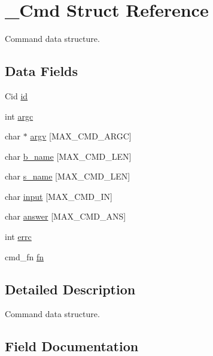 \hypertarget{struct__Cmd}{}\section{\+\_\+\+Cmd Struct Reference}
\label{struct__Cmd}


Command data structure.  


\subsection*{Data Fields}
\begin{DoxyCompactItemize}
\item 
Cid \hyperlink{struct__Cmd_a106b2045967078710623e3a5f401dde2}{id}
\item 
int \hyperlink{struct__Cmd_af56ffa5c8c8f19251b15dc02a7eb352d}{argc}
\item 
char $\ast$ \hyperlink{struct__Cmd_aaaa6f539ab5219743163ecb74138fe7a}{argv} \mbox{[}M\+A\+X\+\_\+\+C\+M\+D\+\_\+\+A\+R\+GC\mbox{]}
\item 
char \hyperlink{struct__Cmd_adb97870a775bf9f9075d44420cb82439}{b\+\_\+name} \mbox{[}M\+A\+X\+\_\+\+C\+M\+D\+\_\+\+L\+EN\mbox{]}
\item 
char \hyperlink{struct__Cmd_ac7a8c09e258cb2b2f63d179943616d08}{s\+\_\+name} \mbox{[}M\+A\+X\+\_\+\+C\+M\+D\+\_\+\+L\+EN\mbox{]}
\item 
char \hyperlink{struct__Cmd_a3d023ded28ab2b9ec8daae3ebf1a3759}{input} \mbox{[}M\+A\+X\+\_\+\+C\+M\+D\+\_\+\+IN\mbox{]}
\item 
char \hyperlink{struct__Cmd_a143c62700ed611e1ff0d70611c76fa55}{answer} \mbox{[}M\+A\+X\+\_\+\+C\+M\+D\+\_\+\+A\+NS\mbox{]}
\item 
int \hyperlink{struct__Cmd_a4f3acf8cfdc67548121c1989765cbbcf}{errc}
\item 
cmd\+\_\+fn \hyperlink{struct__Cmd_abfca5a0889206135702ed3e398079bad}{fn}
\end{DoxyCompactItemize}


\subsection{Detailed Description}
Command data structure. 

\subsection{Field Documentation}
\mbox{\label{struct__Cmd_a106b2045967078710623e3a5f401dde2}} 
